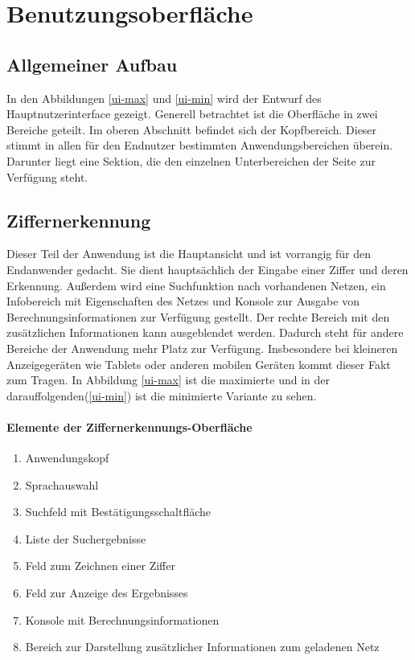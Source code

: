 \newpage
\section{Benutzungsoberfläche}
\subsection{Allgemeiner Aufbau}
In den Abbildungen \ref{ui-max} und \ref{ui-min} wird der  Entwurf des Hauptnutzerinterface gezeigt. Generell betrachtet ist die Oberfläche in zwei Bereiche geteilt. Im oberen Abschnitt befindet sich der Kopfbereich. Dieser stimmt in allen für den Endnutzer bestimmten Anwendungsbereichen überein. Darunter liegt eine Sektion, die den einzelnen Unterbereichen der Seite zur Verfügung steht.

\subsection{Ziffernerkennung}
Dieser Teil der Anwendung ist die Hauptansicht und ist vorrangig für den Endanwender gedacht. Sie dient hauptsächlich der Eingabe einer Ziffer und deren Erkennung. Außerdem wird eine Suchfunktion nach vorhandenen Netzen, ein Infobereich mit Eigenschaften des Netzes und Konsole zur Ausgabe von Berechnungsinformationen zur Verfügung gestellt. Der rechte  Bereich mit den zusätzlichen Informationen kann ausgeblendet werden. Dadurch steht für andere Bereiche der Anwendung mehr Platz zur Verfügung. Insbesondere bei kleineren Anzeigegeräten wie Tablets oder anderen mobilen Geräten kommt dieser Fakt zum Tragen. In Abbildung \ref{ui-max} ist die maximierte und in der darauffolgenden(\ref{ui-min}) ist die minimierte Variante zu sehen.
 
 \paragraph{Elemente der Ziffernerkennungs-Oberfläche}
 \begin{enumerate}
 	\item Anwendungskopf
 	\item Sprachauswahl
 	\item Suchfeld mit Bestätigungsschaltfläche
 	\item Liste der Suchergebnisse
 	\item Feld zum Zeichnen einer Ziffer
 	\item Feld zur Anzeige des Ergebnisses
 	\item Konsole mit Berechnungsinformationen
 	\item Bereich zur Darstellung zusätzlicher Informationen zum geladenen Netz
 \end{enumerate}
 
